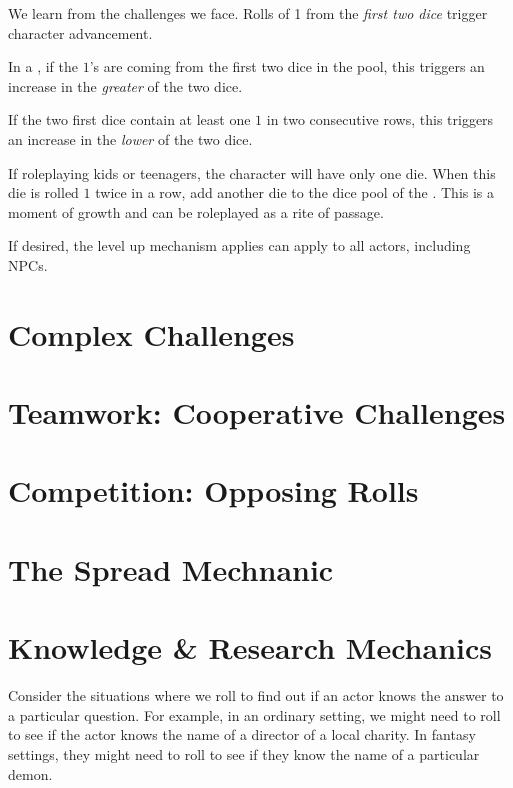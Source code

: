 \label{subsec:character_advancement}

We learn from the challenges we face. Rolls of 1 from the \emph{first two dice} trigger
character advancement.

In a , if the $1$'s are coming from the first two dice in the pool, this
triggers an increase in the \emph{greater} of the two dice.

If the two first dice contain at least one $1$ in two consecutive rows, this triggers an increase
in the \emph{lower} of the two dice.

If roleplaying kids or teenagers, the character will have only one die. When this die is rolled
$1$ twice in a row, add another die to the dice pool of the .
This is a moment of growth and can be roleplayed as a rite of passage.

If desired, the level up mechanism applies can apply to all actors, including NPCs.

\section{Complex Challenges}

\section{Teamwork: Cooperative Challenges}


\section{Competition: Opposing Rolls}

\section{The Spread Mechnanic}

\section{Knowledge \& Research Mechanics}

\label{sec:research_mechanic}

\begin{marginNote}
	
\end{marginNote}

Consider the situations where we roll to find out if an actor knows the answer
to a particular question. For example, in an ordinary setting, we might need
to roll to see if the actor knows the name of a director of a local charity.
In fantasy settings, they might need to roll to see if they know the name of
a particular demon.

